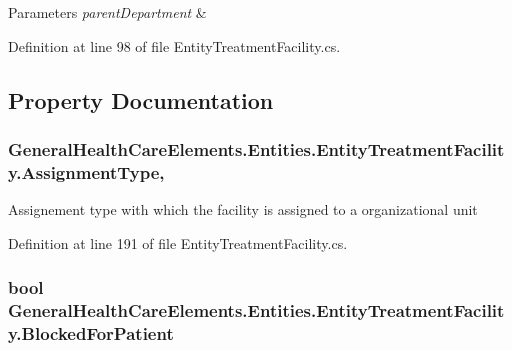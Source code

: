 \begin{DoxyParams}{Parameters}
{\em parent\+Department} & \\
\hline
\end{DoxyParams}


Definition at line 98 of file Entity\+Treatment\+Facility.\+cs.



\subsection{Property Documentation}
\subsubsection[{\texorpdfstring{Assignment\+Type}{AssignmentType}}]{ General\+Health\+Care\+Elements.\+Entities.\+Entity\+Treatment\+Facility.\+Assignment\+Type\hspace{0.3cm}{\ttfamily [get]}, {\ttfamily [set]}}\hypertarget{class_general_health_care_elements_1_1_entities_1_1_entity_treatment_facility_af4ea2fe9d4e80817299065e98da9f193}{}\label{class_general_health_care_elements_1_1_entities_1_1_entity_treatment_facility_af4ea2fe9d4e80817299065e98da9f193}


Assignement type with which the facility is assigned to a organizational unit 



Definition at line 191 of file Entity\+Treatment\+Facility.\+cs.

\subsubsection[{\texorpdfstring{Blocked\+For\+Patient}{BlockedForPatient}}]{\setlength{\rightskip}{0pt plus 5cm}bool General\+Health\+Care\+Elements.\+Entities.\+Entity\+Treatment\+Facility.\+Blocked\+For\+Patient\hspace{0.3cm}{\ttfamily [get]}}\hypertarget{class_general_health_care_elements_1_1_entities_1_1_entity_treatment_facility_a4c62aea332b50270f8b43c96f8fda156}{}\label{class_general_health_care_elements_1_1_entities_1_1_entity_treatment_facility_a4c62aea332b50270f8b43c96f8fda156}


